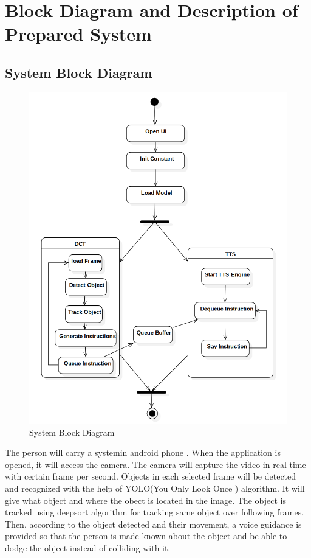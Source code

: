     \chapter{Block Diagram and Description of Prepared System}
        \section{System Block Diagram}
            \begin{figure}[ht]
                \centering
                \includegraphics[scale=0.55]{img/System-Block-Diagram.png}
                \caption{System Block Diagram}
                \label{fig:System Block Diagram}
            \end{figure}
            \break
            The person will carry a systemin android phone . When the application is opened, it will access the camera. The camera will capture the video in real time with certain frame per second. Objects in each selected frame will be detected and recognized with the help of YOLO(You Only Look Once ) algorithm. It will give what object and where the obect is located in the image. The object is tracked using deepsort algorithm for tracking same object over following frames. Then, according to the object detected and their movement, a voice guidance is provided so that the person is made known about the object and be able to dodge the object instead of colliding with it.
